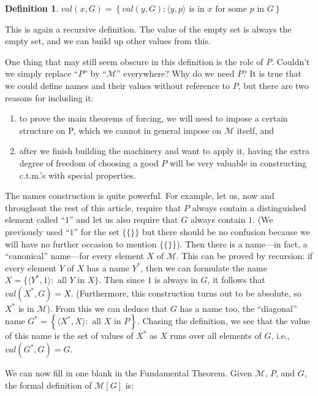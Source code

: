 \documentclass[10pt]{article}
\theoremstyle{definition}
\newtheorem*{defn}{Definition}
\theoremstyle{remark}
\begin{document}
\begin{defn}
$val(x,G) =\left\{val(y,G) : \langle y,p\rangle\text{ is in }x\text{ for some }p\text{ in }G\right\}$
\end{defn}

This is again a recursive definition. The value of the empty set is always the empty set, and we can build up other values from this.

One thing that may still seem obscure in this definition is the role of $P$. Couldn't we simply replace ``$P$'' by ``$\mathcal M$'' everywhere? Why do we need $P$? It is true that we could define names and their values without reference to $P$, but there are two reasons for including it:

\begin{enumerate}
\item to prove the main theorems of forcing, we will need to impose a certain structure on P, which we cannot in general impose on $\mathcal M$ itself, and
\item after we finish building the machinery and want to apply it, having the extra degree of freedom of choosing a good $P$ will be very valuable in constructing c.t.m.'s with special properties.
\end{enumerate}

The names construction is quite powerful. For example, let us, now and throughout the rest of this article, require that $P$ always contain a distinguished element called ``$1$'' and let us also require that $G$ always contain $1$. (We previously used ``$1$'' for the set $\{\{\}\}$ but there should be no confusion because we will have no further occasion to mention $\{\{\}\}$). Then there is a name---in fact, a ``canonical'' name---for every element $X$ of $\mathcal M$. This can be proved by recursion: if every element $Y$ of $X$ has a name $Y^*$, then we can formulate the name $X = \{\langle Y^*,1\rangle :\text{ all }Y\text{ in }X\}$. Then since $1$ is always in $G$, it follows that $val(X^*,G) = X$. (Furthermore, this construction turns out to be absolute, so $X^*$ is in $\mathcal M$). From this we can deduce that $G$ has a name too, the ``diagonal'' name $G^* = \left\{\langle X^*,X\rangle :\text{ all }X\text{ in }P\right\}$. Chasing the definition, we see that the value of this name is the set of values of $X^*$ as $X$ runs over all elements of $G$, i.e., $val(G^*,G) = G$.

We can now fill in one blank in the Fundamental Theorem. Given $\mathcal M$, $P$, and $G$, the formal definition of $\mathcal M[G]$ is: 
\end{document}
